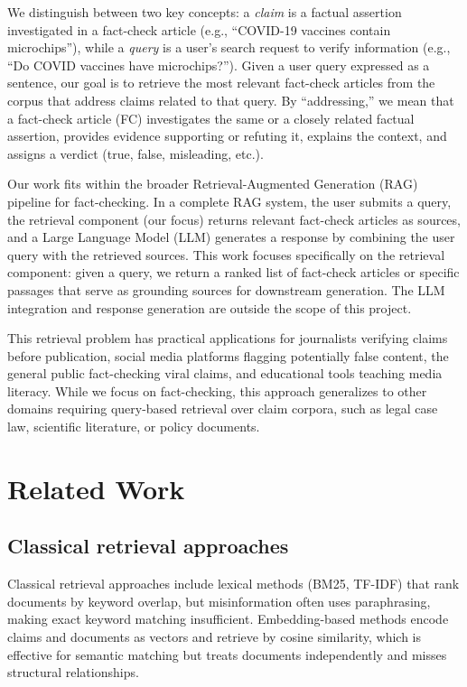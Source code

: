 \documentclass[10pt]{article}
\begin{document}
We distinguish between two key concepts: a \emph{claim} is a factual assertion investigated in a fact-check article (e.g., ``COVID-19 vaccines contain microchips''), while a \emph{query} is a user's search request to verify information (e.g., ``Do COVID vaccines have microchips?''). Given a user query expressed as a sentence, our goal is to retrieve the most relevant fact-check articles from the corpus that address claims related to that query. By ``addressing,'' we mean that a fact-check article (FC) investigates the same or a closely related factual assertion, provides evidence supporting or refuting it, explains the context, and assigns a verdict (true, false, misleading, etc.).

Our work fits within the broader Retrieval-Augmented Generation (RAG) pipeline for fact-checking. In a complete RAG system, the user submits a query, the retrieval component (our focus) returns relevant fact-check articles as sources, and a Large Language Model (LLM) generates a response by combining the user query with the retrieved sources. This work focuses specifically on the retrieval component: given a query, we return a ranked list of fact-check articles or specific passages that serve as grounding sources for downstream generation. The LLM integration and response generation are outside the scope of this project.

This retrieval problem has practical applications for journalists verifying claims before publication, social media platforms flagging potentially false content, the general public fact-checking viral claims, and educational tools teaching media literacy. While we focus on fact-checking, this approach generalizes to other domains requiring query-based retrieval over claim corpora, such as legal case law, scientific literature, or policy documents.


\section{Related Work}
\label{sec:related}

\subsection{Classical retrieval approaches}

Classical retrieval approaches include lexical methods (BM25, TF-IDF) that rank documents by keyword overlap, but misinformation often uses paraphrasing, making exact keyword matching insufficient. Embedding-based methods encode claims and documents as vectors and retrieve by cosine similarity, which is effective for semantic matching but treats documents independently and misses structural relationships.
\end{document}
